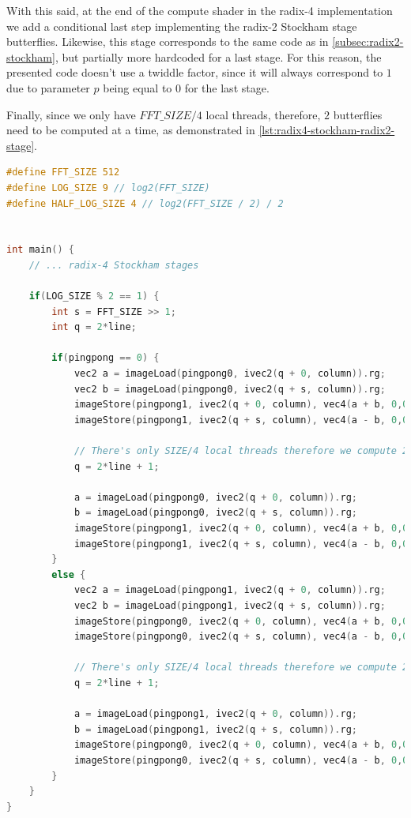 \documentclass[
  oneside,
  11pt, a4paper,
  footinclude=true,
  headinclude=true,
  cleardoublepage=empty
]{scrbook}
\begin{document}
With this said, at the end of the compute shader in the radix-4 implementation we add a conditional last step implementing the radix-2 Stockham stage butterflies. Likewise, this stage corresponds to the same code as in \autoref{subsec:radix2-stockham}, but partially more hardcoded for a last stage. For this reason, the presented code doesn't use a twiddle factor, since it will always correspond to $1$ due to parameter $p$ being equal to $0$ for the last stage.

Finally, since we only have $FFT\_SIZE/4$ local threads, therefore, $2$ butterflies need to be computed at a time, as demonstrated in \autoref{lst:radix4-stockham-radix2-stage}.

\begin{lstlisting}[language=C, caption={Radix-2 stage for the radix-4 Stockham code}, label={lst:radix4-stockham-radix2-stage}]
#define FFT_SIZE 512
#define LOG_SIZE 9 // log2(FFT_SIZE)
#define HALF_LOG_SIZE 4 // log2(FFT_SIZE / 2) / 2


int main() {
    // ... radix-4 Stockham stages

    if(LOG_SIZE % 2 == 1) {
        int s = FFT_SIZE >> 1;
        int q = 2*line;

        if(pingpong == 0) {
            vec2 a = imageLoad(pingpong0, ivec2(q + 0, column)).rg;
            vec2 b = imageLoad(pingpong0, ivec2(q + s, column)).rg;
            imageStore(pingpong1, ivec2(q + 0, column), vec4(a + b, 0,0));
            imageStore(pingpong1, ivec2(q + s, column), vec4(a - b, 0,0));

            // There's only SIZE/4 local threads therefore we compute 2 values
            q = 2*line + 1;

            a = imageLoad(pingpong0, ivec2(q + 0, column)).rg;
            b = imageLoad(pingpong0, ivec2(q + s, column)).rg;
            imageStore(pingpong1, ivec2(q + 0, column), vec4(a + b, 0,0));
            imageStore(pingpong1, ivec2(q + s, column), vec4(a - b, 0,0));
        }
        else {
            vec2 a = imageLoad(pingpong1, ivec2(q + 0, column)).rg;
            vec2 b = imageLoad(pingpong1, ivec2(q + s, column)).rg;
            imageStore(pingpong0, ivec2(q + 0, column), vec4(a + b, 0,0));
            imageStore(pingpong0, ivec2(q + s, column), vec4(a - b, 0,0));

            // There's only SIZE/4 local threads therefore we compute 2 values
            q = 2*line + 1;

            a = imageLoad(pingpong1, ivec2(q + 0, column)).rg;
            b = imageLoad(pingpong1, ivec2(q + s, column)).rg;
            imageStore(pingpong0, ivec2(q + 0, column), vec4(a + b, 0,0));
            imageStore(pingpong0, ivec2(q + s, column), vec4(a - b, 0,0));
        }
    }
}
\end{lstlisting}
\end{document}
